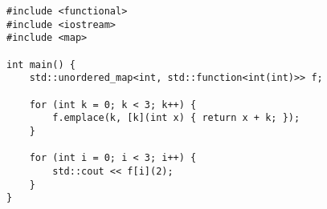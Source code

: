 \begin{lstlisting}[title=\href{https://godbolt.org/z/59KGYs}{\texttt{godbolt.org/z/59KGYs}}]
#include <functional>
#include <iostream>
#include <map>

int main() {
    std::unordered_map<int, std::function<int(int)>> f;
    
    for (int k = 0; k < 3; k++) {
        f.emplace(k, [k](int x) { return x + k; });
    }

    for (int i = 0; i < 3; i++) {
        std::cout << f[i](2);
    }
}
\end{lstlisting}
